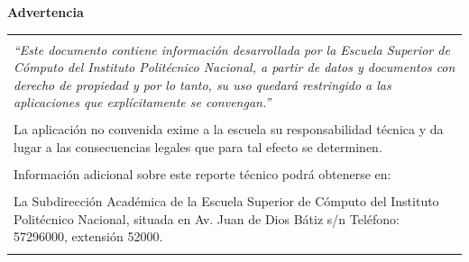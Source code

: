 \thispagestyle{empty} %

\vspace*{4cm} %

\begin{center}
    {\Large \textbf{Advertencia}}
\end{center}

\vspace{1cm}

\centering
\begin{tabular}{||p{}||}
    \hline \hline
    \\
    \textit{``Este documento contiene información desarrollada por la Escuela Superior de Cómputo del Instituto Politécnico Nacional, a partir de datos y documentos con derecho de propiedad y por lo tanto, su uso quedará restringido a las aplicaciones que explícitamente se convengan.''} \\
    \\
    La aplicación no convenida exime a la escuela su responsabilidad técnica y da lugar a las consecuencias legales que para tal efecto se determinen. \\
    \\
    Información adicional sobre este reporte técnico podrá obtenerse en: \\
    \\
    La Subdirección Académica de la Escuela Superior de Cómputo del Instituto Politécnico Nacional, situada en Av. Juan de Dios Bátiz s/n Teléfono: 57296000, extensión 52000. \\
    \\ \hline \hline
\end{tabular}

\newpage %